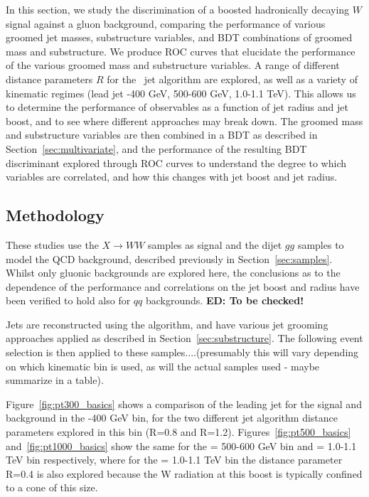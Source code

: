 In this section, we study the discrimination of a boosted hadronically decaying $W$ signal against a gluon
background, comparing the performance of various groomed jet
masses, substructure variables, and BDT combinations of groomed mass
and substructure. We produce ROC
curves that elucidate the performance of the various groomed mass and
substructure variables. A
range of different distance parameters $R$ for the \antikt~jet
algorithm are explored, as well as a variety of kinematic regimes
(lead jet -400 GeV, 500-600 GeV, 1.0-1.1 TeV). This allows us to determine the
performance of observables as a function of jet radius and jet boost, and to see
where different approaches may break down. The groomed
mass and substructure variables are then combined in a BDT as described in Section~\ref{sec:multivariate}, and the performance of the resulting BDT discriminant
explored through ROC curves to understand the degree to which
variables are correlated, and how
this changes with jet boost and jet radius. 

\subsection{Methodology}

These studies use the $X \rightarrow WW$ samples as signal and the dijet $gg$
samples to model the QCD background, described previously in Section~\ref{sec:samples}. Whilst only gluonic backgrounds
are explored here, the conclusions as to the dependence of the
performance and correlations on the jet boost and radius have been
verified to hold also for $qq$ backgrounds. {\bf ED: To be checked!}

Jets are reconstructed using the \antikt algorithm, and have various
jet grooming approaches applied as described in Section~\ref{sec:substructure}. The following event selection is then applied to these
samples....(presumably this will vary depending on which kinematic bin
is used, as will the actual samples used - maybe summarize in a table).

Figure~\ref{fig:pt300_basics} shows a comparison of the
leading jet \pt for the signal and background in the -400 GeV bin, for the two different \antikt jet
algorithm distance parameters explored in this bin (R=0.8 and R=1.2). Figures~\ref{fig:pt500_basics} and~\ref{fig:pt1000_basics}  show the same for the
\pt = 500-600 GeV bin and \pt = 1.0-1.1 TeV bin respectively, where for
the \pt = 1.0-1.1 TeV bin the distance parameter R=0.4 is also explored because the W radiation at this boost is typically confined to 
a cone of this size.


